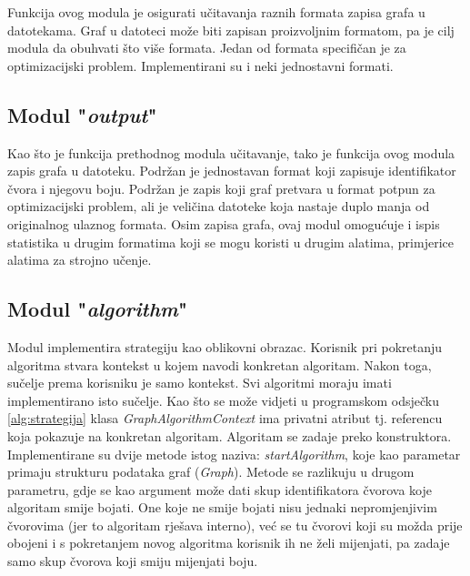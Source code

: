 \documentclass[times, utf8, diplomski, numeric]{fer}
\begin{document}
Funkcija ovog modula je osigurati učitavanja raznih formata zapisa grafa u datotekama. Graf u datoteci može biti zapisan proizvoljnim formatom, pa je cilj modula da obuhvati što više formata. Jedan od formata specifičan je za optimizacijski problem. Implementirani su i neki jednostavni formati. 

\subsection{Modul "\emph{output}"}

Kao što je funkcija prethodnog modula učitavanje, tako je funkcija ovog modula zapis grafa u datoteku. Podržan je jednostavan format koji zapisuje identifikator čvora i njegovu boju. Podržan je zapis koji graf pretvara u format potpun za optimizacijski problem, ali je veličina datoteke koja nastaje duplo manja od originalnog ulaznog formata. Osim zapisa grafa, ovaj modul omogućuje i ispis statistika u drugim formatima koji se mogu koristi u drugim alatima, primjerice alatima za strojno učenje.

\subsection{Modul "\emph{algorithm}"}

Modul implementira strategiju kao oblikovni obrazac. Korisnik pri pokretanju algoritma stvara kontekst u kojem navodi konkretan algoritam. Nakon toga, sučelje prema korisniku je samo kontekst. Svi algoritmi moraju imati implementirano isto sučelje. Kao što se može vidjeti u programskom odsječku \ref{alg:strategija} klasa \emph{GraphAlgorithmContext} ima privatni atribut tj. referencu koja pokazuje na konkretan algoritam. Algoritam se zadaje preko konstruktora. Implementirane su dvije metode istog naziva: \emph{startAlgorithm}, koje kao parametar primaju strukturu podataka graf (\emph{Graph}). Metode se razlikuju u drugom parametru, gdje se kao argument može dati skup identifikatora čvorova koje algoritam smije bojati. One koje ne smije bojati nisu jednaki nepromjenjivim čvorovima (jer to algoritam rješava interno), već se tu čvorovi koji su možda prije obojeni i s pokretanjem novog algoritma korisnik ih ne želi mijenjati, pa zadaje samo skup čvorova koji smiju mijenjati boju. 
\end{document}
